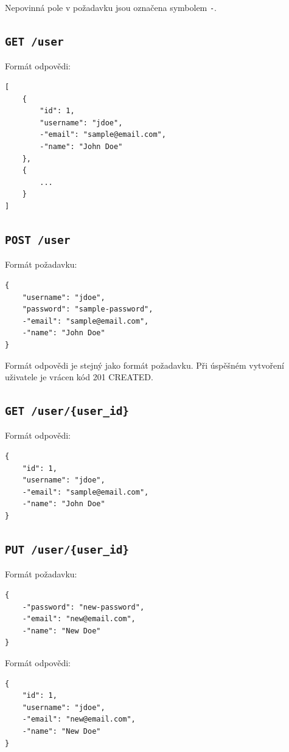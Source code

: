 \documentclass[thesis=B,czech]{FITthesis}[2012/06/26]
\begin{document}
		Nepovinná pole v požadavku jsou označena symbolem \texttt{-}.
	
		\subsection{\texttt{GET /user}}
			Formát odpovědi:
			\begin{Verbatim}[obeytabs,tabsize=2]
[
	{
		"id": 1,
		"username": "jdoe",
		-"email": "sample@email.com",
		-"name": "John Doe"
	},
	{
		...
	}
]
			\end{Verbatim}

			
		\subsection{\texttt{POST /user}}
			Formát požadavku:
			\begin{Verbatim}[obeytabs,tabsize=2]
{
	"username": "jdoe",
	"password": "sample-password",
	-"email": "sample@email.com",
	-"name": "John Doe"
}	
			\end{Verbatim}
			
			\noindent
			Formát odpovědi je stejný jako formát požadavku. Při úspěšném vytvoření uživatele je vrácen kód 201 CREATED.
			

		\subsection{\texttt{GET /user/\{user\_id\}}}
			Formát odpovědi:
			\begin{Verbatim}[obeytabs,tabsize=2]
{
	"id": 1,
	"username": "jdoe",
	-"email": "sample@email.com",
	-"name": "John Doe"
}
			\end{Verbatim}
			
		\subsection{\texttt{PUT /user/\{user\_id\}}}
			Formát požadavku:
			\begin{Verbatim}[obeytabs,tabsize=2]			
{
	-"password": "new-password",
	-"email": "new@email.com",
	-"name": "New Doe"
}				
			\end{Verbatim}
			
			\noindent
			Formát odpovědi:
			\begin{Verbatim}[obeytabs,tabsize=2]
{
	"id": 1,
	"username": "jdoe",
	-"email": "new@email.com",
	-"name": "New Doe"
}
			\end{Verbatim}
\end{document}
